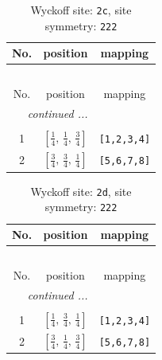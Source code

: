 \documentclass[fleqn,8pt]{jsarticle}
\begin{document}
\renewcommand{\arraystretch}{1.2}
\begin{longtable}{ccc}
\caption{Wyckoff site: {\tt 2c}, site symmetry: {\tt 222}}
 \\
 \hline \hline
No. & position & mapping \\ \hline \endfirsthead

\multicolumn{2}{l}{\tablename\ \thetable{}} \\
 \hline \hline
No. & position & mapping \\ \hline \endhead

 \hline \hline
\multicolumn{2}{r}{\footnotesize\it continued ...} \\ \endfoot

 \hline \hline
\multicolumn{2}{r}{} \\ \endlastfoot

1 & $\left[ \frac{1}{4},\, \frac{1}{4},\, \frac{3}{4} \right]$ & {\tt [1,2,3,4]} \\ \hline
2 & $\left[ \frac{3}{4},\, \frac{3}{4},\, \frac{1}{4} \right]$ & {\tt [5,6,7,8]} \\
\end{longtable}
\renewcommand{\arraystretch}{1.2}
\begin{longtable}{ccc}
\caption{Wyckoff site: {\tt 2d}, site symmetry: {\tt 222}}
 \\
 \hline \hline
No. & position & mapping \\ \hline \endfirsthead

\multicolumn{2}{l}{\tablename\ \thetable{}} \\
 \hline \hline
No. & position & mapping \\ \hline \endhead

 \hline \hline
\multicolumn{2}{r}{\footnotesize\it continued ...} \\ \endfoot

 \hline \hline
\multicolumn{2}{r}{} \\ \endlastfoot

1 & $\left[ \frac{1}{4},\, \frac{3}{4},\, \frac{1}{4} \right]$ & {\tt [1,2,3,4]} \\ \hline
2 & $\left[ \frac{3}{4},\, \frac{1}{4},\, \frac{3}{4} \right]$ & {\tt [5,6,7,8]} \\
\end{longtable}
\renewcommand{\arraystretch}{1.2}
\end{document}

